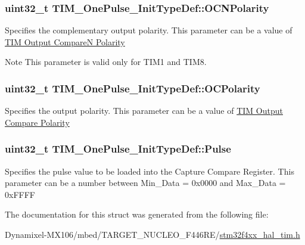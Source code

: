 \subsubsection[{\texorpdfstring{O\+C\+N\+Polarity}{OCNPolarity}}]{\setlength{\rightskip}{0pt plus 5cm}uint32\+\_\+t T\+I\+M\+\_\+\+One\+Pulse\+\_\+\+Init\+Type\+Def\+::\+O\+C\+N\+Polarity}\hypertarget{struct_t_i_m___one_pulse___init_type_def_a00deac6c3347b0482955d936351c6388}{}\label{struct_t_i_m___one_pulse___init_type_def_a00deac6c3347b0482955d936351c6388}
Specifies the complementary output polarity. This parameter can be a value of \hyperlink{group___t_i_m___output___compare___n___polarity}{T\+IM Output CompareN Polarity} \begin{DoxyNote}{Note}
This parameter is valid only for T\+I\+M1 and T\+I\+M8. 
\end{DoxyNote}
\subsubsection[{\texorpdfstring{O\+C\+Polarity}{OCPolarity}}]{\setlength{\rightskip}{0pt plus 5cm}uint32\+\_\+t T\+I\+M\+\_\+\+One\+Pulse\+\_\+\+Init\+Type\+Def\+::\+O\+C\+Polarity}\hypertarget{struct_t_i_m___one_pulse___init_type_def_a3028787ad41698072cbf70ddf1b6c984}{}\label{struct_t_i_m___one_pulse___init_type_def_a3028787ad41698072cbf70ddf1b6c984}
Specifies the output polarity. This parameter can be a value of \hyperlink{group___t_i_m___output___compare___polarity}{T\+IM Output Compare Polarity} 
\subsubsection[{\texorpdfstring{Pulse}{Pulse}}]{\setlength{\rightskip}{0pt plus 5cm}uint32\+\_\+t T\+I\+M\+\_\+\+One\+Pulse\+\_\+\+Init\+Type\+Def\+::\+Pulse}\hypertarget{struct_t_i_m___one_pulse___init_type_def_a4f1fbf6d60812c3194e9ee8a05f5cfa6}{}\label{struct_t_i_m___one_pulse___init_type_def_a4f1fbf6d60812c3194e9ee8a05f5cfa6}
Specifies the pulse value to be loaded into the Capture Compare Register. This parameter can be a number between Min\+\_\+\+Data = 0x0000 and Max\+\_\+\+Data = 0x\+F\+F\+FF 

The documentation for this struct was generated from the following file\+:\begin{DoxyCompactItemize}
\item 
Dynamixel-\/\+M\+X106/mbed/\+T\+A\+R\+G\+E\+T\+\_\+\+N\+U\+C\+L\+E\+O\+\_\+\+F446\+R\+E/\hyperlink{stm32f4xx__hal__tim_8h}{stm32f4xx\+\_\+hal\+\_\+tim.\+h}\end{DoxyCompactItemize}
